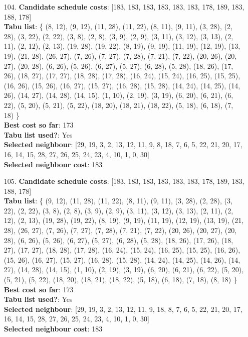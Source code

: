 \documentclass[fleqn]{article}
\begin{document}
\begin{itemize}
    \item[104.] \textbf{Candidate schedule costs}: [183, 183, 183, 183, 183, 183, 178, 189, 183, 188, 178] \\
    \textbf{Tabu list}: \{ (8, 12), (9, 12), (11, 28), (11, 22), (8, 11), (9, 11), (3, 28), (2, 28), (3, 22), (2, 22), (3, 8), (2, 8), (3, 9), (2, 9), (3, 11), (3, 12), (3, 13), (2, 11), (2, 12), (2, 13), (19, 28), (19, 22), (8, 19), (9, 19), (11, 19), (12, 19), (13, 19), (21, 28), (26, 27), (7, 26), (7, 27), (7, 28), (7, 21), (7, 22), (20, 26), (20, 27), (20, 28), (6, 26), (5, 26), (6, 27), (5, 27), (6, 28), (5, 28), (18, 26), (17, 26), (18, 27), (17, 27), (18, 28), (17, 28), (16, 24), (15, 24), (16, 25), (15, 25), (16, 26), (15, 26), (16, 27), (15, 27), (16, 28), (15, 28), (14, 24), (14, 25), (14, 26), (14, 27), (14, 28), (14, 15), (1, 10), (2, 19), (3, 19), (6, 20), (6, 21), (6, 22), (5, 20), (5, 21), (5, 22), (18, 20), (18, 21), (18, 22), (5, 18), (6, 18), (7, 18) \} \\
    \textbf{Best cost so far}: 173 \\
    \textbf{Tabu list used?}: Yes \\
    \textbf{Selected neighbour}: [29, 19, 3, 2, 13, 12, 11, 9, 8, 18, 7, 6, 5, 22, 21, 20, 17, 16, 14, 15, 28, 27, 26, 25, 24, 23, 4, 10, 1, 0, 30] \\
    \textbf{Selected neighbour cost}: 183
      

    \item[105.] \textbf{Candidate schedule costs}: [183, 183, 183, 183, 183, 183, 178, 189, 183, 188, 178] \\
    \textbf{Tabu list}: \{ (9, 12), (11, 28), (11, 22), (8, 11), (9, 11), (3, 28), (2, 28), (3, 22), (2, 22), (3, 8), (2, 8), (3, 9), (2, 9), (3, 11), (3, 12), (3, 13), (2, 11), (2, 12), (2, 13), (19, 28), (19, 22), (8, 19), (9, 19), (11, 19), (12, 19), (13, 19), (21, 28), (26, 27), (7, 26), (7, 27), (7, 28), (7, 21), (7, 22), (20, 26), (20, 27), (20, 28), (6, 26), (5, 26), (6, 27), (5, 27), (6, 28), (5, 28), (18, 26), (17, 26), (18, 27), (17, 27), (18, 28), (17, 28), (16, 24), (15, 24), (16, 25), (15, 25), (16, 26), (15, 26), (16, 27), (15, 27), (16, 28), (15, 28), (14, 24), (14, 25), (14, 26), (14, 27), (14, 28), (14, 15), (1, 10), (2, 19), (3, 19), (6, 20), (6, 21), (6, 22), (5, 20), (5, 21), (5, 22), (18, 20), (18, 21), (18, 22), (5, 18), (6, 18), (7, 18), (8, 18) \} \\
    \textbf{Best cost so far}: 173 \\
    \textbf{Tabu list used?}: Yes \\
    \textbf{Selected neighbour}: [29, 19, 3, 2, 13, 12, 11, 9, 18, 8, 7, 6, 5, 22, 21, 20, 17, 16, 14, 15, 28, 27, 26, 25, 24, 23, 4, 10, 1, 0, 30] \\
    \textbf{Selected neighbour cost}: 183
      


\end{itemize}
\end{document}

